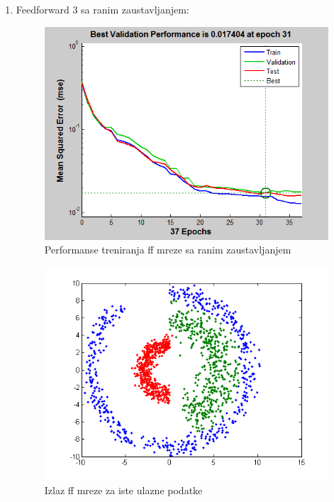 \documentclass{report}
\begin{document}
\begin{enumerate}
\begin{enumerate}
\newpage
\item\LARGE
Feedforward 3 sa ranim zaustavljanjem:\large

\begin{figure}[!h]
\begin{center}
\includegraphics[scale=0.8]{B1performanceFF3early.png}
\caption{Performanse treniranja ff mreze sa ranim zaustavljanjem}
\end{center}
\end{figure}

\begin{figure}[!h]
\begin{center}
\includegraphics[scale=0.8]{B1outputFF3earlySame.png}
\caption{Izlaz ff mreze za iste ulazne podatke}
\end{center}
\end{figure}


\end{enumerate}
\end{enumerate}
\end{document}
